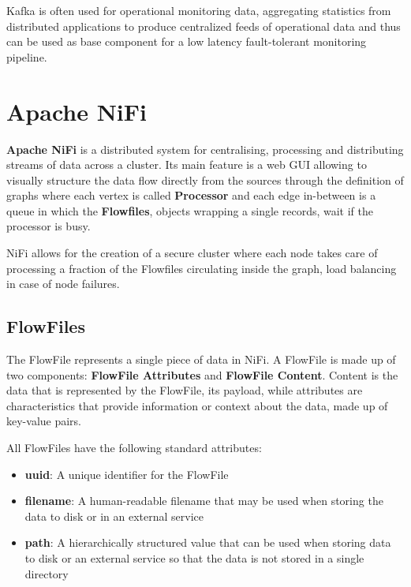 Kafka is often used for operational monitoring data, aggregating statistics from distributed applications to produce centralized feeds of operational data and thus can be used as base component for a low latency fault-tolerant monitoring pipeline.


\section{Apache NiFi}

\textbf{Apache NiFi} is a distributed system for centralising, processing and distributing streams of data across a cluster. Its main feature is a web GUI allowing to visually structure the data flow directly from the sources through the definition of graphs where each vertex is called \textbf{Processor} and each edge in-between is a queue in which the \textbf{Flowfiles}, objects wrapping a single records, wait if the processor is busy.

NiFi allows for the creation of a secure cluster where each node takes care of processing a fraction of the Flowfiles circulating inside the graph, load balancing in case of node failures. 

\subsection{FlowFiles}

The FlowFile represents a single piece of data in NiFi. A FlowFile is made up of two components: \textbf{FlowFile Attributes} and \textbf{FlowFile Content}. Content is the data that is represented by the FlowFile, its payload, while attributes are characteristics that provide information or context about the data, made up of key-value pairs. 

All FlowFiles have the following standard attributes:

\begin{itemize}
    \item \textbf{uuid}: A unique identifier for the FlowFile
    
    \item \textbf{filename}: A human-readable filename that may be used when storing the data to disk or in an external service
    
    \item \textbf{path}: A hierarchically structured value that can be used when storing data to disk or an external service so that the data is not stored in a single directory
\end{itemize}

